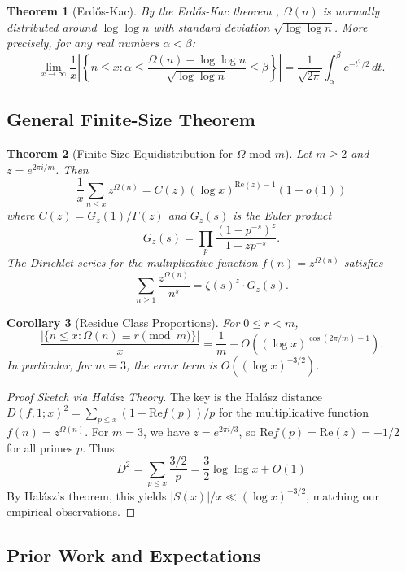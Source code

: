 \documentclass[12pt]{article}
\newtheorem{theorem}{Theorem}[section]
\newtheorem{corollary}[theorem]{Corollary}
\theoremstyle{definition}
\theoremstyle{remark}
\begin{document}
\begin{theorem}[Erd\H{o}s-Kac]
By the Erd\H{o}s-Kac theorem \cite{erdos1940gaussian}, $\Omega(n)$ is normally distributed around $\log \log n$ with standard deviation $\sqrt{\log \log n}$. More precisely, for any real numbers $\alpha < \beta$:
\[
\lim_{x \to \infty} \frac{1}{x} \left|\left\{n \leq x : \alpha \leq \frac{\Omega(n) - \log \log n}{\sqrt{\log \log n}} \leq \beta\right\}\right| = \frac{1}{\sqrt{2\pi}} \int_{\alpha}^{\beta} e^{-t^2/2} \, dt.
\]
\end{theorem}

\subsection{General Finite-Size Theorem}

\begin{theorem}[Finite-Size Equidistribution for $\Omega$ mod $m$]\label{thm:main}
Let $m \geq 2$ and $z = e^{2\pi i/m}$. Then
\[
\frac{1}{x}\sum_{n \leq x} z^{\Omega(n)} = C(z) (\log x)^{\mathrm{Re}(z) - 1}(1 + o(1))
\]
where $C(z) = G_z(1)/\Gamma(z)$ and $G_z(s)$ is the Euler product
\[
G_z(s) = \prod_{p} \frac{(1 - p^{-s})^z}{1 - zp^{-s}}.
\]
The Dirichlet series for the multiplicative function $f(n) = z^{\Omega(n)}$ satisfies
\[
\sum_{n \geq 1}\frac{z^{\Omega(n)}}{n^s} = \zeta(s)^z \cdot G_z(s).
\]
\end{theorem}

\begin{corollary}[Residue Class Proportions]
For $0 \leq r < m$,
\[
\frac{|\{n \leq x : \Omega(n) \equiv r \pmod{m}\}|}{x} = \frac{1}{m} + O\left((\log x)^{\cos(2\pi/m) - 1}\right).
\]
In particular, for $m = 3$, the error term is $O((\log x)^{-3/2})$.
\end{corollary}

\begin{proof}[Proof Sketch via Hal\'asz Theory]
The key is the Hal\'asz distance $D(f, 1; x)^2 = \sum_{p \leq x} (1 - \mathrm{Re} f(p))/p$ for the multiplicative function $f(n) = z^{\Omega(n)}$. For $m = 3$, we have $z = e^{2\pi i/3}$, so $\mathrm{Re} f(p) = \mathrm{Re}(z) = -1/2$ for all primes $p$. Thus:
\[
D^2 = \sum_{p \leq x} \frac{3/2}{p} = \frac{3}{2} \log \log x + O(1)
\]
By Hal\'asz's theorem, this yields $|S(x)|/x \ll (\log x)^{-3/2}$, matching our empirical observations.
\end{proof}

\subsection{Prior Work and Expectations}
\end{document}
